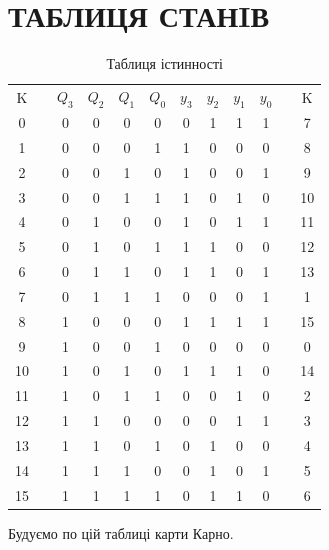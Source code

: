 \documentclass[a4paper,14pt]{extreport}
\begin{document}
\begin{figure}[h!]
\end{figure}

\chapter{  ТАБЛИЦЯ СТАНIВ   }
\begin{table}[h!]

\begin{center}


\begin{tabular}{c|ccccc|ccccc|c}
K && $Q_{3}$ & $Q_{2}$ & $Q_{1}$ & $Q_{0}$ & $  y_{3}$ & $y_{2}$ & $y_{1}  $ & $y_{0}$&& K\\
 0 && 0 & 0 & 0 & 0 & 0 & 1 & 1 & 1   &&7 \\
1 && 0 & 0 & 0 & 1 & 1 & 0 & 0 & 0 &&  8  \\
2 && 0 & 0 & 1 & 0 & 1 & 0 & 0 & 1 &&  9  \\
3 && 0 & 0 & 1 & 1 & 1 & 0 & 1 & 0 &&  10 \\
4 && 0 & 1 & 0 & 0 & 1 & 0 & 1 & 1 &&  11 \\
5 && 0 & 1 & 0 & 1 & 1 & 1 & 0 & 0 &&  12 \\
6 && 0 & 1 & 1 & 0 & 1 & 1 & 0 & 1 &&  13 \\
7 && 0 & 1 & 1 & 1 & 0 & 0 & 0 & 1 &&  1  \\
8 && 1 & 0 & 0 & 0 & 1 & 1 & 1 & 1 &&  15 \\
9 && 1 & 0 & 0 & 1 & 0 & 0 & 0 & 0 &&  0  \\
10&& 1 & 0 & 1 & 0 & 1 & 1 & 1 & 0 &&  14 \\
11&& 1 & 0 & 1 & 1 & 0 & 0 & 1 & 0 &&  2  \\
12&& 1 & 1 & 0 & 0 & 0 & 0 & 1 & 1 &&  3  \\
13&& 1 & 1 & 0 & 1 & 0 & 1 & 0 & 0 &&  4  \\
14&& 1 & 1 & 1 & 0 & 0 & 1 & 0 & 1 &&  5  \\
15&& 1 & 1 & 1 & 1 & 0 & 1 & 1 & 0 &&  6  \\
\end{tabular}

\caption{Таблиця істинності }
\end{center}
\end{table}
\vspace{1cm}
Будуємо по цій таблиці карти Карно.\\ 
\end{document}
